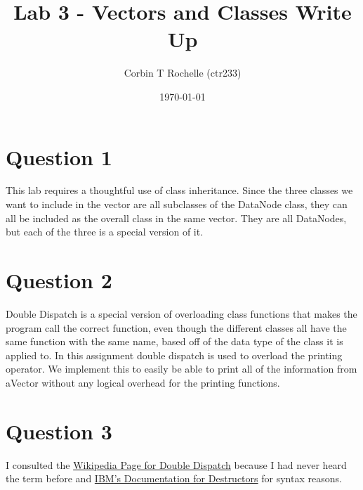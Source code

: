 \documentclass[12pt]{article}
\title{Lab 3 - Vectors and Classes Write Up}
\author{Corbin T Rochelle (ctr233)}
\date{\today}
\begin{document}
\maketitle

\section{Question 1}
This lab requires a thoughtful use of class inheritance. 
Since the three classes we want to include in the vector are all subclasses of the DataNode class, they can all be included as the overall class in the same vector. 
They are all DataNodes, but each of the three is a special version of it.

\section{Question 2}
Double Dispatch is a special version of overloading class functions that makes the program call the correct function, even though the different classes all have the same function with the same name, based off of the data type of the class it is applied to. 
In this assignment double dispatch is used to overload the printing operator.
We implement this to easily be able to print all of the information from aVector without any logical overhead for the printing functions. 

\section{Question 3}
I consulted the \href{https://en.wikipedia.org/wiki/Double_dispatch}{Wikipedia Page for Double Dispatch} because I had never heard the term before and \href{https://www.ibm.com/docs/en/i/7.3?topic=only-destructors-c}{IBM's Documentation for Destructors} for syntax reasons.
\end{document}
